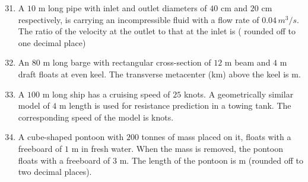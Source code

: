 \documentclass[journal]{IEEEtran}
\theoremstyle{remark}
\begin{document}
\begin{enumerate}[itemsep=1em]
\setcounter{enumi}{30}
\item A $10$ m long pipe with inlet and outlet diameters of $40$ cm and $20$ cm respectively, is carrying an incompressible fluid with a flow rate of $0.04\, m^3/s$. The ratio of the velocity at the outlet to that at the inlet is \underline{\hspace{2cm}}( rounded off to one decimal place) 
\end{enumerate}

\newpage
\vspace*{0.25cm}

\begin{enumerate}[itemsep=1em]
\setcounter{enumi}{31}
\item An $80$ m long barge with rectangular cross-section of $12$ m beam and $4$ m draft floats at even keel. The transverse metacenter (km) above the keel is \underline{\hspace{2cm}} m. 
\end{enumerate}

\begin{enumerate}[itemsep=1em]
\setcounter{enumi}{32}
\item A $100$ m long ship has a cruising speed of $25$ knots. A geometrically similar model of $4$ m length is used for resistance prediction in a towing tank. The corresponding speed of the model is \underline{\hspace{2cm}} knots. 
\end{enumerate}

\begin{enumerate}[itemsep=1em]
\setcounter{enumi}{33}
\item A cube-shaped pontoon with $200$ tonnes of mass placed on it, floats with a freeboard of $1$ m in fresh water. When the mass is removed, the pontoon floats with a freeboard of $3$ m. The length of the pontoon is \underline{\hspace{2cm}} m (rounded off to two decimal places).
\end{enumerate}
\end{document}
